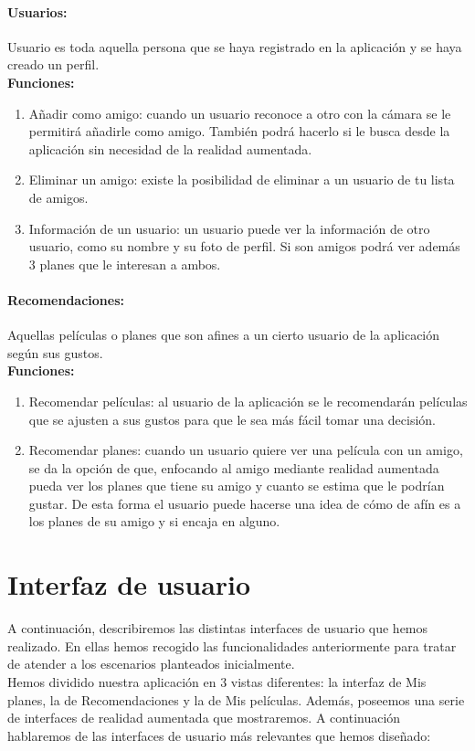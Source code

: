 \paragraph{\large Usuarios:\\}
Usuario es toda aquella persona que se haya registrado en la aplicación y se haya creado un perfil.
\\
\textbf{Funciones:}
\begin{enumerate}
    \item Añadir como amigo: cuando un usuario reconoce a otro con la cámara se le permitirá añadirle como amigo. También podrá hacerlo si le busca desde la aplicación sin necesidad de la realidad aumentada.
    \item Eliminar un amigo: existe la posibilidad de eliminar a un usuario de tu lista de amigos.
    \item Información de un usuario: un usuario puede ver la información de otro usuario, como su nombre y su foto de perfil. Si son amigos podrá ver además 3 planes que le interesan a ambos.
\end{enumerate} 

\paragraph{\large Recomendaciones:\\}
Aquellas películas o planes que son afines a un cierto usuario de la aplicación según sus gustos.
\\
\textbf{Funciones:}
\begin{enumerate}
    \item Recomendar películas: al usuario de la aplicación se le recomendarán películas que se ajusten a sus gustos para que le sea más fácil tomar una decisión.
    \item Recomendar planes: cuando un usuario quiere ver una película con un amigo, se da la opción de que, enfocando al amigo mediante realidad aumentada pueda ver los planes que tiene su amigo y 
    cuanto se estima que le podrían gustar. De esta forma el usuario puede hacerse una idea de cómo de afín es a los planes de su amigo y si encaja en alguno.
\end{enumerate} 

\section{Interfaz de usuario}
\label{makereference3.4}
A continuación, describiremos las distintas interfaces de usuario que hemos realizado. En ellas hemos recogido las funcionalidades anteriormente para tratar de atender a los escenarios planteados inicialmente.
\\
Hemos dividido nuestra aplicación en 3 vistas diferentes: la interfaz de Mis planes, la de Recomendaciones y la de Mis películas. Además, poseemos una serie de interfaces de realidad aumentada que mostraremos. A continuación hablaremos
de las interfaces de usuario más relevantes que hemos diseñado:
